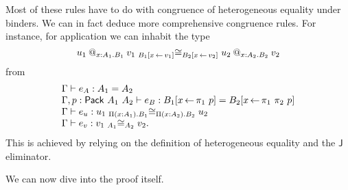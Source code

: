 \begin{remark}
  Most of these rules have to do with congruence of heterogeneous equality
  under binders. We can in fact deduce more comprehensive congruence rules.
  For instance, for application we can inhabit the type
  \[
    \Heq
      {B_1[x \sto v_1]}
      {\app{u_1}{x:A_1}{B_1}{v_1}}
      {B_2[x \sto v_2]}
      {\app{u_2}{x:A_2}{B_2}{v_2}}
  \]
  from
  \[
    \begin{array}{l}
      \Ga \vdash e_A : A_1 = A_2 \\
      \Ga, p : \Pack{A_1}{A_2} \vdash
      e_B : B_1[x \sto \pi_1\ p] = B_2[x \sto \pi_1\ \pi_2\ p] \\
      \Ga \vdash e_u : \Heq{\Pi(x:A_1).B_1}{u_1}{\Pi(x:A_2).B_2}{u_2} \\
      \Ga \vdash e_v : \Heq{A_1}{v_1}{A_2}{v_2}.
    \end{array}
  \]
  This is achieved by relying on the definition of heterogeneous equality and
  the \(\mathsf{J}\) eliminator.
\end{remark}

We can now dive into the proof itself.